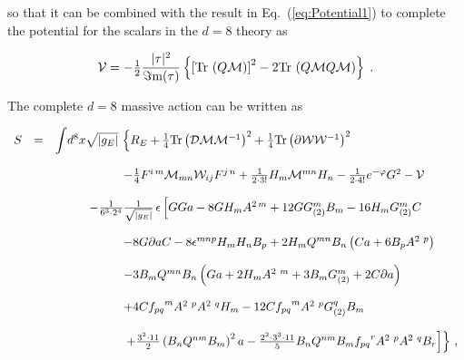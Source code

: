 \documentclass[12pt,a4paper]{article}
\begin{document}
\noindent so that it can be combined with the result in 
Eq.~(\ref{eq:Potential1}) to complete the potential for the scalars in
the $d=8$ theory as

\begin{equation}
{\cal V} =
-{\textstyle\frac{1}{2}}
\frac{|\tau |^{2}}{\Im{\rm m} (\tau )}
\left\{\left[{\rm Tr}\, \left( Q\mathcal{M}\right)\right]^{2}
-2{\rm Tr}\, \left( Q\mathcal{M}Q\mathcal{M} \right)
\right\} \; .
\end{equation}

The complete $d=8$ massive action can be written as

\begin{equation}
\label{eq:d8massiveaction}
  \begin{array}{rcl}
S & = & {\displaystyle\int} d^{8}x \sqrt{|g_{E}|}\,
\left\{ 
R_{E} 
+\frac{1}{4}{\rm Tr}\left(\mathcal{D} {\cal M}{\cal M}^{-1}\right)^{2}
+\frac{1}{4}{\rm Tr}\left(\partial {\cal W}{\cal W}^{-1}\right)^{2}
 \right.\\
& & \\
& & 
\hspace{2cm}
-\frac{1}{4}F^{i\, m}{\cal M}_{mn}{\cal W}_{ij} F^{j\, n} 
+\frac{1}{2\cdot 3!} H_{m}{\cal M}^{mn} H_{n}
-\frac{1}{2\cdot 4!} e^{-\varphi} G^{2} 
-{\cal V} \\
& & \\
& & 
\hspace{1cm}
-\frac{1}{6^{3}\cdot 2^{4}}
{\textstyle\frac{1}{\sqrt{|g_{E}|}}}\, \epsilon
\left[GGa -8G H_{m} A^{2\, m} +12 G G_{(2)}^{m}B_{m}
-16 H_{m} G_{(2)}^{m} C
\right.\\
&& \\
& & 
\hspace{2cm}
-8G\partial a C
-8\epsilon^{mnp} H_{m}H_{n}B_{p} 
+2H_{m}Q^{mn}B_{n}\left(
                     Ca + 6 B_{p}A^{2\ p}
                  \right)
\\
&& \\
&&
\hspace{2cm}
-3 B_{m}Q^{mn}B_{n}\left(
                       Ga + 2H_{m}A^{2\ m} 
                     + 3 B_{m}G_{(2)}^{m}+2C\partial a
                   \right)
 \\
&& \\
&& 
\hspace{2cm}
+4C{f_{pq}}^{m}A^{2\ p}A^{2\ q}H_{m}
-12 C {f_{pq}}^{m} A^{2\ p}G_{(2)}^{q}B_{m}\\
& & \\
& & 
\hspace{2cm}
\left.\left.
+\textstyle{\frac{3^{2}\cdot 11}{2}}\left(
                                      B_{n}Q^{nm}B_{m}
                                    \right)^{2}a
-\textstyle{\frac{2^{2}\cdot 3^{3}\cdot 11}{5}}B_{n}Q^{nm}B_{m}
       {f_{pq}}^{r} A^{2\ p}A^{2\ q}B_{r}
\right]\right\} \, ,\\
\end{array}
\end{equation}
\end{document}
